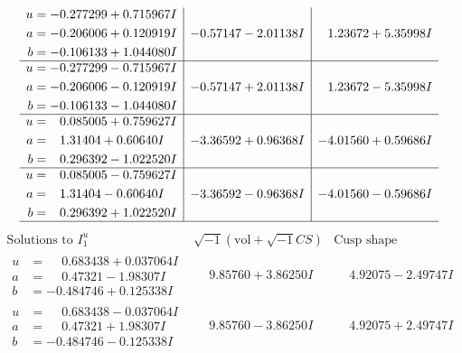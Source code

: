\documentclass[1p]{elsarticle_modified}
\theoremstyle{definition}
\newcommand{\I}{\sqrt{-1}}
\begin{document}
$$\begin{array}{c|c|c}
\begin{aligned}
u &= -0.277299 + 0.715967 I \\
a &= -0.206006 + 0.120919 I \\
b &= -0.106133 + 1.044080 I\end{aligned}
 & -0.57147 - 2.01138 I & \phantom{-}1.23672 + 5.35998 I \\ \hline\begin{aligned}
u &= -0.277299 - 0.715967 I \\
a &= -0.206006 - 0.120919 I \\
b &= -0.106133 - 1.044080 I\end{aligned}
 & -0.57147 + 2.01138 I & \phantom{-}1.23672 - 5.35998 I \\ \hline\begin{aligned}
u &= \phantom{-}0.085005 + 0.759627 I \\
a &= \phantom{-}1.31404 + 0.60640 I \\
b &= \phantom{-}0.296392 - 1.022520 I\end{aligned}
 & -3.36592 + 0.96368 I & -4.01560 + 0.59686 I \\ \hline\begin{aligned}
u &= \phantom{-}0.085005 - 0.759627 I \\
a &= \phantom{-}1.31404 - 0.60640 I \\
b &= \phantom{-}0.296392 + 1.022520 I\end{aligned}
 & -3.36592 - 0.96368 I & -4.01560 - 0.59686 I\\
 \hline 
 \end{array}$$\newpage$$\begin{array}{c|c|c}  
\text{Solutions to }I^u_{1}& \I (\text{vol} + \sqrt{-1}CS) & \text{Cusp shape}\\
 \hline 
\begin{aligned}
u &= \phantom{-}0.683438 + 0.037064 I \\
a &= \phantom{-}0.47321 - 1.98307 I \\
b &= -0.484746 + 0.125338 I\end{aligned}
 & \phantom{-}9.85760 + 3.86250 I & \phantom{-}4.92075 - 2.49747 I \\ \hline\begin{aligned}
u &= \phantom{-}0.683438 - 0.037064 I \\
a &= \phantom{-}0.47321 + 1.98307 I \\
b &= -0.484746 - 0.125338 I\end{aligned}
 & \phantom{-}9.85760 - 3.86250 I & \phantom{-}4.92075 + 2.49747 I \\ \hline\begin{aligned}

\end{aligned}
\end{array}$$
\end{document}
